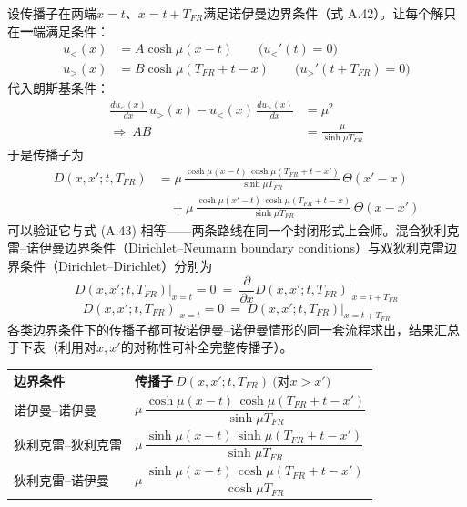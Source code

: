 设传播子在两端$x=t$、$x=t+T_{FR}$满足诺伊曼边界条件（式 A.42）。让每个解只在\textbf{一}端满足条件：
\begin{align*}
u_<(x)&=A\cosh\mu(x-t)
\qquad\bigl(u_<'(t)=0\bigr)\\
u_>(x)&=B\cosh\mu(T_{FR}+t-x)
\qquad\bigl(u_>'(t+T_{FR})=0\bigr)
\end{align*}
代入朗斯基条件：
\begin{align*}
\frac{du_<(x)}{dx}\,u_>(x)-u_<(x)\,\frac{du_>(x)}{dx}&=\mu^2\\
\Rightarrow\ AB&=\frac{\mu}{\sinh\mu T_{FR}}
\end{align*}
于是传播子为
\begin{align*}
D(x,x';t,T_{FR})
&=\mu\,\frac{\cosh\mu(x-t)\,\cosh\mu(T_{FR}+t-x')}{\sinh\mu T_{FR}}\,
\Theta(x'-x)\\
&\quad+\mu\,\frac{\cosh\mu(x'-t)\,\cosh\mu(T_{FR}+t-x)}{\sinh\mu T_{FR}}\,
\Theta(x-x')
\end{align*}
可以验证它与式 (A.43) 相等——两条路线在同一个封闭形式上会师。混合狄利克雷--诺伊曼边界条件（Dirichlet--Neumann boundary conditions）与双狄利克雷边界条件（Dirichlet--Dirichlet）分别为
\begin{equation*}
D(x,x';t,T_{FR})\Bigr|_{x=t}=0\ =\
\frac{\partial}{\partial x}D(x,x';t,T_{FR})\Bigr|_{x=t+T_{FR}}
\tag{A.45}
\end{equation*}
\begin{equation*}
D(x,x';t,T_{FR})\Bigr|_{x=t}=0\ =\
D(x,x';t,T_{FR})\Bigr|_{x=t+T_{FR}}
\end{equation*}
各类边界条件下的传播子都可按诺伊曼--诺伊曼情形的同一套流程求出，结果汇总于下表（利用对$x,x'$的对称性可补全完整传播子）。

\origtab{A.1}{不同边界条件下传播子的汇总}

\begin{center}
\begin{tabular}{@{}l@{\qquad\qquad}l@{}}
\textbf{边界条件} & \textbf{传播子}$\ D(x,x';t,T_{FR})\ ($对$x>x')$\\[0.4em]
诺伊曼--诺伊曼 &
$\mu\,\dfrac{\cosh\mu(x-t)\,\cosh\mu(T_{FR}+t-x')}{\sinh\mu T_{FR}}$\\[1.2em]
狄利克雷--狄利克雷 &
$\mu\,\dfrac{\sinh\mu(x-t)\,\sinh\mu(T_{FR}+t-x')}{\sinh\mu T_{FR}}$\\[1.2em]
狄利克雷--诺伊曼 &
$\mu\,\dfrac{\sinh\mu(x-t)\,\cosh\mu(T_{FR}+t-x')}{\cosh\mu T_{FR}}$\\
\end{tabular}
\end{center}

